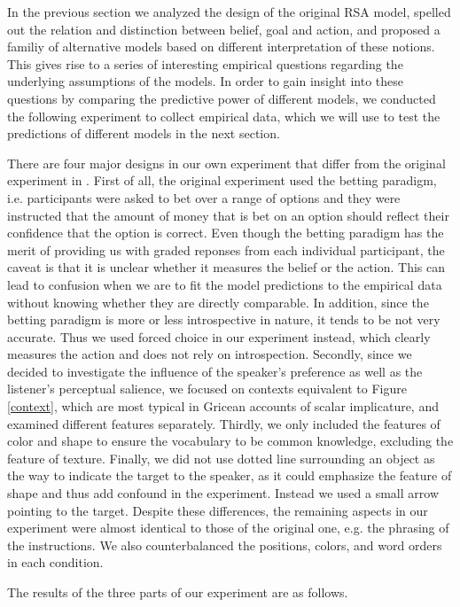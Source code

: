 In the previous section we analyzed the design of the original RSA model, spelled out the relation and distinction between belief, goal and action, and proposed a familiy of alternative models based on different interpretation of these notions. This gives rise to a series of interesting empirical questions regarding the underlying assumptions of the models. In order to gain insight into these questions by comparing the predictive power of different models, we conducted the following experiment to collect empirical data, which we will use to test the predictions of different models in the next section.

There are four major designs in our own experiment that differ from the original experiment in \cite{Frank}. First of all, the original experiment used the betting paradigm, i.e. participants were asked to bet over a range of options and they were instructed that the amount of money that is bet on an option should reflect their confidence that the option is correct. Even though the betting paradigm has the merit of providing us with graded reponses from each individual participant, the caveat is that it is unclear whether it measures the belief or the action. This can lead to confusion when we are to fit the model predictions to the empirical data without knowing whether they are directly comparable. In addition, since the betting paradigm is more or less introspective in nature, it tends to be not very accurate. Thus we used forced choice in our experiment instead, which clearly measures the action and does not rely on introspection.
Secondly, since we decided to investigate the influence of the speaker's preference as well as the listener's perceptual salience, we focused on contexts equivalent to Figure \ref{context}, which are most typical in Gricean accounts of scalar implicature, and examined different features separately.
Thirdly, we only included the features of color and shape to ensure the vocabulary to be common knowledge, excluding the feature of texture. Finally, we did not use dotted line surrounding an object as the way to indicate the target to the speaker, as it could emphasize the feature of shape and thus add confound in the experiment. Instead we used a small arrow pointing to the target. Despite these differences, the remaining aspects in our experiment were almost identical to those of the original one, e.g. the phrasing of the instructions. We also counterbalanced the positions,  colors, and word orders in each condition.

The results of the three parts of our experiment are as follows.


